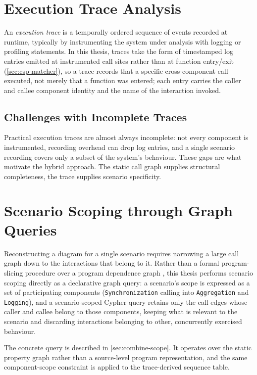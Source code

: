 \section{Execution Trace Analysis}\label{sec:trace-analysis}

An \emph{execution trace} is a temporally ordered sequence of events
recorded at runtime, typically by instrumenting the system under
analysis with logging or profiling statements. In
this thesis, traces take the form of timestamped log entries emitted at
instrumented call sites rather than at function entry/exit
(\cref{sec:csp-matcher}), so a trace records that a specific
cross-component call executed, not merely that a function was entered;
each entry carries the caller and callee component identity and the
name of the interaction invoked.

\subsection{Challenges with Incomplete Traces}

Practical execution traces are almost always incomplete: not every
component is instrumented, recording overhead can drop log entries, and
a single scenario recording covers only a subset of the system's
behaviour. These gaps are what motivate the hybrid approach. The
static call graph supplies structural completeness, the trace supplies
scenario specificity.

\section{Scenario Scoping through Graph Queries}\label{sec:scenario-scoping}

Reconstructing a diagram for a single scenario requires narrowing a
large call graph down to the interactions that belong to it. Rather than
a formal program-slicing procedure \cite{weiser:slicing} over a program
dependence graph \cite{ferrante:pdg}, this thesis performs scenario
scoping directly as a declarative graph query:
a scenario's scope is expressed as a set of participating components
(\eg \texttt{Synchronization} calling into \texttt{Aggregation} and
\texttt{Logging}), and a scenario-scoped Cypher query retains only the
call edges whose caller and callee belong to those components, keeping
what is relevant to the scenario and discarding interactions belonging
to other, concurrently exercised behaviour.

The concrete query is described in \cref{sec:combine-scope}. It operates
over the static property graph rather than a source-level program
representation, and the same component-scope constraint is applied to
the trace-derived sequence table.

